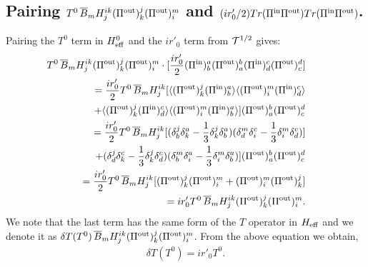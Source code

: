 \documentclass[aps,preprint,floats,epsf,epsfig,nofootinbib,letter]{revtex4}
\newcommand{\be}{\begin{eqnarray}}
\newcommand{\en}{\end{eqnarray}}
\newcommand{\T}{{\cal T}}
\newcommand{\la}{{\langle}}
\newcommand{\ra}{{\rangle}}
\newcommand{\non}{{\nonumber}}
\begin{document}

\subsection{Pairing $T^0\, \overline B_m H^{ik}_j (\Pi^{\rm out})^j_k (\Pi^{\rm out})^m_i$ and $(i r'_0/2) Tr(\Pi^{\rm in}\Pi^{\rm out})Tr(\Pi^{\rm in}\Pi^{\rm out})$.}
Pairing the $T^0$ term in $H^0_{\rm eff}$ and the $ir'_0$ term from $\T^{1/2}$ gives:
\be
&&
\hspace{-1cm}
  T^0\, \overline B_m H^{ik}_j (\Pi^{\rm out})^j_k (\Pi^{\rm out})^m_i 
 \cdot
  [\frac{ir'_0}{2}(\Pi^{\rm in})^a_b(\Pi^{\rm out})^b_a(\Pi^{\rm in})^c_d(\Pi^{\rm out})^d_c]
\non\\
&&=\frac{ir'_0}{2} T^0\, \overline B_m H^{ik}_j 
  [\la (\Pi^{\rm out})^j_k (\Pi^{\rm in})^a_b\ra
   \la (\Pi^{\rm out})^m_i  (\Pi^{\rm in})^c_d\ra
\non\\
&&\quad
+
\la (\Pi^{\rm out})^j_k  (\Pi^{\rm in})^c_d\ra
\la (\Pi^{\rm out})^m_i (\Pi^{\rm in})^a_b\ra]
(\Pi^{\rm out})^b_a (\Pi^{\rm out})^d_c
\non\\
&&= \frac{ir'_0}{2} T^0\, \overline B_m H^{ik}_j 
[(\delta^j_b \delta^a_k-\frac{1}{3}\delta^j_k \delta^a_b)
(\delta^m_d  \delta^c_i-\frac{1}{3}\delta^m_i  \delta^c_d)]
\non\\
&&\quad
+(\delta^j_d \delta^c_k-\frac{1}{3}\delta^j_k \delta^c_d)
(\delta^m_b\delta^a_i-\frac{1}{3}\delta^m_i\delta^a_b)]
(\Pi^{\rm out})^b_a (\Pi^{\rm out})^d_c
\non\\
&&=\frac{ir'_0}{2} T^0\, \overline B_m H^{ik}_j 
[(\Pi^{\rm out})^j_k (\Pi^{\rm out})^m_i
+(\Pi^{\rm out})^m_i (\Pi^{\rm out})^j_k]
\non\\
&&=ir'_0 T^0\,\overline B_m H^{ik}_j (\Pi^{\rm out})^j_k (\Pi^{\rm out})^m_i.
\en
We note that the last term has the same form of the $T$ operator in $H_{\rm eff}$ and we denote it as $\delta T(T^0)\,\overline B_m H^{ik}_j (\Pi^{\rm out})^j_k (\Pi^{\rm out})^m_i$. 
From the above equation we obtain,
\be
\delta T(T^0)=i r'_0 T^0.
\en

\end{document}
